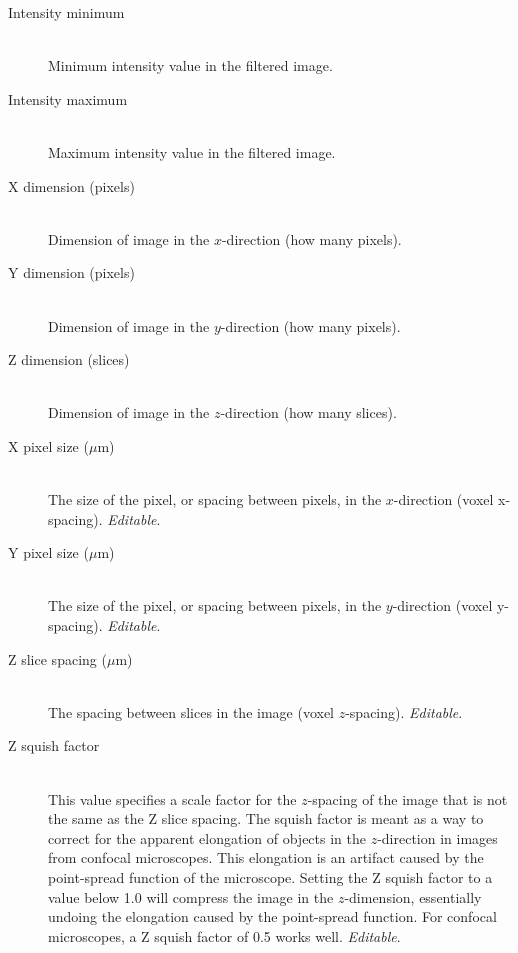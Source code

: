 \documentclass[11pt,titlepage,twoside]{article}
\begin{document}
\begin{description}

\item[Intensity minimum] \hfill \\
Minimum intensity value in the filtered image.

\item[Intensity maximum] \hfill \\
Maximum intensity value in the filtered image.

\item[X dimension (pixels)] \hfill \\
Dimension of image in the $x$-direction (how many pixels).

\item[Y dimension (pixels)] \hfill \\ 
Dimension of image in the $y$-direction (how many pixels).

\item[Z dimension (slices)] \hfill \\
Dimension of image in the $z$-direction (how many slices).

\item[X pixel size ($\mu$m)] \hfill \\ 
The size of the pixel, or spacing between pixels, in the $x$-direction (voxel x-spacing). \emph{Editable}.

\item[Y pixel size ($\mu$m)] \hfill \\
The size of the pixel, or spacing between pixels, in the $y$-direction (voxel y-spacing). \emph{Editable}.

\item[Z slice spacing ($\mu$m)] \hfill \\
The spacing between slices in the image (voxel $z$-spacing). \emph{Editable}.

\item[Z squish factor] \hfill \\
This value specifies a scale factor for the $z$-spacing of the image that is not the same as the Z slice spacing. The squish factor is meant as a way to correct for the apparent elongation of objects in the $z$-direction in images from confocal microscopes. This elongation is an artifact caused by the point-spread function of the microscope. Setting the Z squish factor to a value below 1.0 will compress the image in the $z$-dimension, essentially undoing the elongation caused by the point-spread function. For confocal microscopes, a Z squish factor of 0.5 works well. \emph{Editable}.

\end{description}
\end{document}
